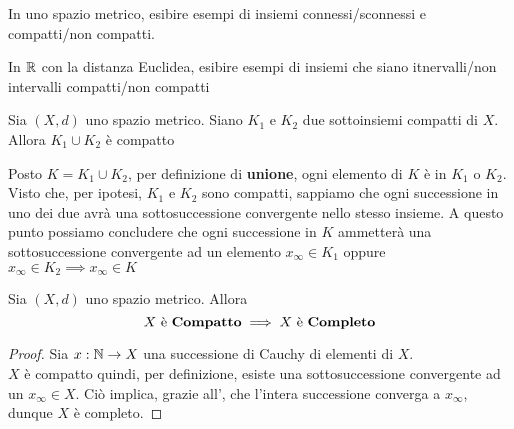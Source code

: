 \cbend
\begin{exercise}
	In uno spazio metrico, esibire esempi di insiemi connessi/sconnessi e compatti/non compatti.
\end{exercise}
\begin{exercise}
	In $\mathbb{R}$ con la distanza Euclidea, esibire esempi di insiemi che siano itnervalli/non intervalli compatti/non compatti
\end{exercise}
\begin{exercise}
	\label{ex:unione_compatti}
	Sia $(X,d)$ uno spazio metrico. Siano $K_1$ e $K_2$ due sottoinsiemi compatti di $X$. Allora $K_1 \cup K_2$ è compatto
	\begin{solution}
		Posto $K = K_1 \cup K_2$, per definizione di \textbf{unione}, ogni elemento di $K$ è in $K_1$ o $K_2$.\\
		Visto che, per ipotesi, $K_1$ e $K_2$ sono compatti, sappiamo che ogni successione in uno dei due avrà una sottosuccessione convergente nello stesso insieme. A questo punto possiamo concludere che ogni successione in $K$ ammetterà una sottosuccessione convergente ad un elemento $x_\infty \in K_1$ oppure $x_\infty \in K_2 \implies x_\infty \in K$
	\end{solution}
\end{exercise}

\begin{proposition}
	Sia $(X,d)$ uno spazio metrico. Allora
	\[X \text{ è \textbf{Compatto}} \implies X \text{ è \textbf{Completo}}\]
	\begin{proof}
		Sia $x: \mathbb{N} \to X$ una successione di Cauchy di elementi di $X$.\\
		$X$ è compatto quindi, per definizione, esiste una sottosuccessione convergente ad un $x_\infty \in X$. Ciò implica, grazie all', che l'intera successione converga a $x_\infty$, dunque $X$ è completo.
	\end{proof}
\end{proposition}

